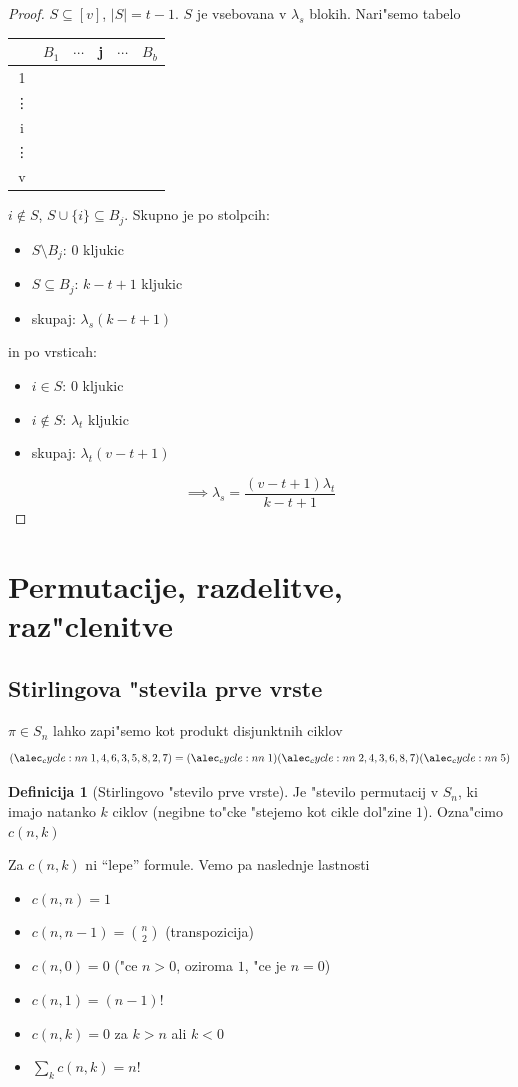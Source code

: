 \documentclass[a4paper,12pt]{article}
\theoremstyle{definition}
\newtheorem{defn}[counter]{Definicija}
\theoremstyle{remark}
\begin{document}
\begin{proof}
	$S \subseteq [v]$, $|S| = t - 1$. $S$ je vsebovana v $\lambda_s$ blokih.
	Nari"semo tabelo
	\begin{center}
		\begin{tabular}{c|c c c c c}
		     & $B_1$ & $\cdots$ & j & $\cdots$ & $B_b$ \\
		\hline
		     1 \\
		     \vdots \\
		     i & & & \checkmark\\
		     \vdots \\
		     v
		\end{tabular}
	\end{center}
	$i \notin S$, $S \cup \{i\} \subseteq B_j$. Skupno je po stolpcih:
	\begin{itemize}
	    \item $S\setminus B_j$: $0$ kljukic
	    \item $S \subseteq B_j$: $k-t+1$ kljukic
	    \item[] skupaj: $\lambda_s (k-t+1)$
	\end{itemize}
	in po vrsticah:
	\begin{itemize}
	    \item $i\in S$: $0$ kljukic
	    \item $i\notin S$: $\lambda_t$ kljukic
	    \item[] skupaj: $\lambda_t (v-t+1)$
	\end{itemize}

	\[\implies \lambda_s = \frac{(v - t + 1)\lambda_t}{k-t+1}\]
\end{proof}



\section{Permutacije, razdelitve, raz"clenitve}
\subsection{Stirlingova "stevila prve vrste}
$\pi \in S_n$ lahko zapi"semo kot produkt disjunktnih ciklov
\[\cycle{1, 4, 6, 3, 5, 8, 2, 7} = \cycle{1}\cycle{2, 4, 3, 6, 8, 7}\cycle{5}\]

\begin{defn}[Stirlingovo "stevilo prve vrste]
	Je "stevilo permutacij v $S_n$, ki imajo natanko $k$ ciklov (negibne to"cke "stejemo kot cikle dol"zine $1$). Ozna"cimo $c(n, k)$
\end{defn}
Za $c(n, k)$ ni ``lepe'' formule. Vemo pa naslednje lastnosti
\begin{itemize}
	\item $c(n, n) = 1$
	\item $c (n, n-1) = \binom{n}{2}$ (transpozicija)
	\item $c(n, 0) = 0$ ("ce $n > 0$, oziroma $1$, "ce je $n = 0$)
	\item $c(n, 1) = (n-1)!$
	\item $c(n, k) = 0$ za $k > n$ ali $k < 0$
	\item $\sum_k c(n, k) = n!$
\end{itemize}
\end{document}
